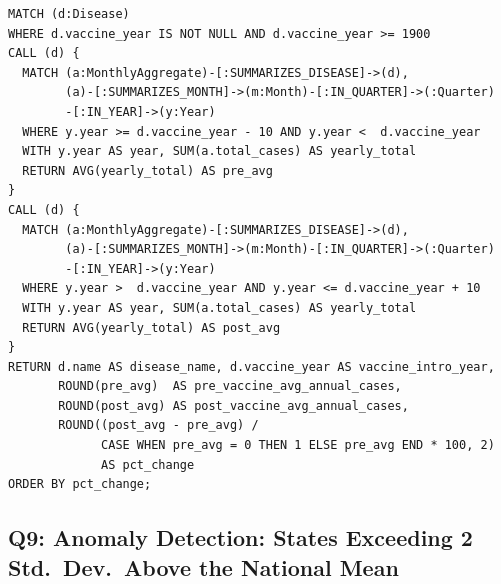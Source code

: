 \documentclass[12pt,a4paper]{article}
\begin{document}
\begin{lstlisting}[language=cypher, caption={Q8: Neo4j. Two \texttt{CALL} subqueries scoped to each disease compute the pre- and post-vaccine averages in a single statement.}]
MATCH (d:Disease)
WHERE d.vaccine_year IS NOT NULL AND d.vaccine_year >= 1900
CALL (d) {
  MATCH (a:MonthlyAggregate)-[:SUMMARIZES_DISEASE]->(d),
        (a)-[:SUMMARIZES_MONTH]->(m:Month)-[:IN_QUARTER]->(:Quarter)
        -[:IN_YEAR]->(y:Year)
  WHERE y.year >= d.vaccine_year - 10 AND y.year <  d.vaccine_year
  WITH y.year AS year, SUM(a.total_cases) AS yearly_total
  RETURN AVG(yearly_total) AS pre_avg
}
CALL (d) {
  MATCH (a:MonthlyAggregate)-[:SUMMARIZES_DISEASE]->(d),
        (a)-[:SUMMARIZES_MONTH]->(m:Month)-[:IN_QUARTER]->(:Quarter)
        -[:IN_YEAR]->(y:Year)
  WHERE y.year >  d.vaccine_year AND y.year <= d.vaccine_year + 10
  WITH y.year AS year, SUM(a.total_cases) AS yearly_total
  RETURN AVG(yearly_total) AS post_avg
}
RETURN d.name AS disease_name, d.vaccine_year AS vaccine_intro_year,
       ROUND(pre_avg)  AS pre_vaccine_avg_annual_cases,
       ROUND(post_avg) AS post_vaccine_avg_annual_cases,
       ROUND((post_avg - pre_avg) /
             CASE WHEN pre_avg = 0 THEN 1 ELSE pre_avg END * 100, 2)
             AS pct_change
ORDER BY pct_change;
\end{lstlisting}


\subsection*{Q9: Anomaly Detection: States Exceeding 2 Std.\ Dev.\ Above the National Mean}
\end{document}
